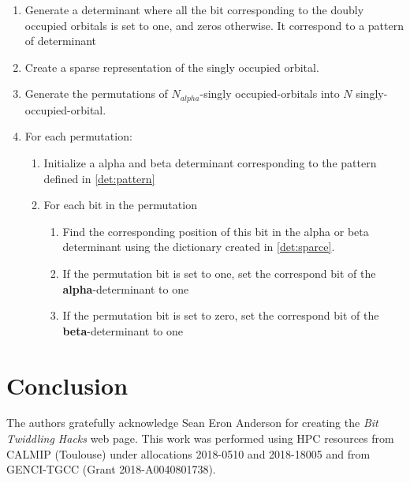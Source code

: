 \documentclass[aip,jcp,reprint,showkeys]{revtex4-1}
\begin{document}
\begin{enumerate}
    \item Generate a determinant where all the bit corresponding to the doubly occupied orbitals is set to one, and zeros otherwise. It correspond to a pattern of determinant \label{det:pattern}
    \item Create a sparse representation of the singly occupied orbital.\label{det:sparce}     %
    \item Generate the permutations of $N_{alpha}$-singly occupied-orbitals into $N$ singly-occupied-orbital. 
    \item For each permutation:
        \begin{enumerate}
            \item Initialize a alpha and beta determinant corresponding to the pattern defined in \ref{det:pattern}
            \item For each bit in the permutation
            \begin{enumerate}
                \item Find the corresponding position of this bit in the alpha or beta determinant using the dictionary created in \ref{det:sparce}.
                \item If the permutation bit is set to one, set the correspond bit of the \textbf{alpha}-determinant to one
                \item  If the permutation bit is set to zero, set the correspond bit of the \textbf{beta}-determinant to one
            \end{enumerate}
        \end{enumerate}
\end{enumerate}




\section{Conclusion}


\begin{acknowledgments}
The authors gratefully acknowledge Sean Eron Anderson for creating the 
\emph{Bit Twiddling Hacks} web page.
This work was performed using HPC resources from CALMIP (Toulouse) under
allocations 2018-0510 and 2018-18005 and from GENCI-TGCC (Grant
2018-A0040801738).
\end{acknowledgments}



\end{document}
